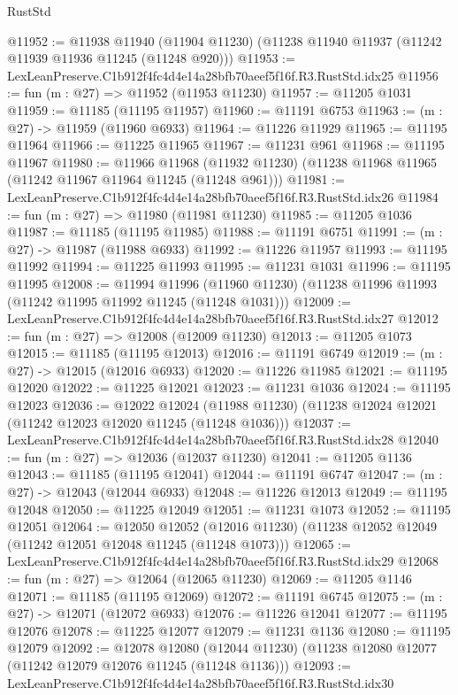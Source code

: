 \begin{lexlean}{RustStd}
\begin{coremodule}
@11952 := @11938
    @11940
    (@11904 @11230)
    (@11238 @11940 @11937 (@11242 @11939 @11936 @11245 (@11248 @920)))
@11953 := LexLeanPreserve.C1b912f4fc4d4e14a28bfb70aeef5f16f.R3.RustStd.idx25
@11956 := fun (m : @27) => @11952 (@11953 @11230)
@11957 := @11205 @1031
@11959 := @11185 (@11195 @11957)
@11960 := @11191 @6753
@11963 := (m : @27) -> @11959 (@11960 @6933)
@11964 := @11226 @11929
@11965 := @11195 @11964
@11966 := @11225 @11965
@11967 := @11231 @961
@11968 := @11195 @11967
@11980 := @11966
    @11968
    (@11932 @11230)
    (@11238 @11968 @11965 (@11242 @11967 @11964 @11245 (@11248 @961)))
@11981 := LexLeanPreserve.C1b912f4fc4d4e14a28bfb70aeef5f16f.R3.RustStd.idx26
@11984 := fun (m : @27) => @11980 (@11981 @11230)
@11985 := @11205 @1036
@11987 := @11185 (@11195 @11985)
@11988 := @11191 @6751
@11991 := (m : @27) -> @11987 (@11988 @6933)
@11992 := @11226 @11957
@11993 := @11195 @11992
@11994 := @11225 @11993
@11995 := @11231 @1031
@11996 := @11195 @11995
@12008 := @11994
    @11996
    (@11960 @11230)
    (@11238 @11996 @11993 (@11242 @11995 @11992 @11245 (@11248 @1031)))
@12009 := LexLeanPreserve.C1b912f4fc4d4e14a28bfb70aeef5f16f.R3.RustStd.idx27
@12012 := fun (m : @27) => @12008 (@12009 @11230)
@12013 := @11205 @1073
@12015 := @11185 (@11195 @12013)
@12016 := @11191 @6749
@12019 := (m : @27) -> @12015 (@12016 @6933)
@12020 := @11226 @11985
@12021 := @11195 @12020
@12022 := @11225 @12021
@12023 := @11231 @1036
@12024 := @11195 @12023
@12036 := @12022
    @12024
    (@11988 @11230)
    (@11238 @12024 @12021 (@11242 @12023 @12020 @11245 (@11248 @1036)))
@12037 := LexLeanPreserve.C1b912f4fc4d4e14a28bfb70aeef5f16f.R3.RustStd.idx28
@12040 := fun (m : @27) => @12036 (@12037 @11230)
@12041 := @11205 @1136
@12043 := @11185 (@11195 @12041)
@12044 := @11191 @6747
@12047 := (m : @27) -> @12043 (@12044 @6933)
@12048 := @11226 @12013
@12049 := @11195 @12048
@12050 := @11225 @12049
@12051 := @11231 @1073
@12052 := @11195 @12051
@12064 := @12050
    @12052
    (@12016 @11230)
    (@11238 @12052 @12049 (@11242 @12051 @12048 @11245 (@11248 @1073)))
@12065 := LexLeanPreserve.C1b912f4fc4d4e14a28bfb70aeef5f16f.R3.RustStd.idx29
@12068 := fun (m : @27) => @12064 (@12065 @11230)
@12069 := @11205 @1146
@12071 := @11185 (@11195 @12069)
@12072 := @11191 @6745
@12075 := (m : @27) -> @12071 (@12072 @6933)
@12076 := @11226 @12041
@12077 := @11195 @12076
@12078 := @11225 @12077
@12079 := @11231 @1136
@12080 := @11195 @12079
@12092 := @12078
    @12080
    (@12044 @11230)
    (@11238 @12080 @12077 (@11242 @12079 @12076 @11245 (@11248 @1136)))
@12093 := LexLeanPreserve.C1b912f4fc4d4e14a28bfb70aeef5f16f.R3.RustStd.idx30

\end{coremodule}
\end{lexlean}
